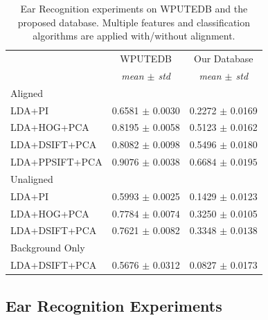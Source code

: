\begin{table}
\centering
\begin{tabular}{|l|c|c|}
\hline
& WPUTEDB & Our Database\\
& \emph{mean $\pm$ std} & \emph{mean $\pm$ std} \\
\hline\hline
\multicolumn{3}{|l|}{Aligned}\\
\hline

LDA+PI              &  0.6581 $\pm$ 0.0030 &       0.2272 $\pm$ 0.0169 \\
LDA+HOG+PCA         &  0.8195 $\pm$ 0.0058 &       0.5123 $\pm$ 0.0162 \\
LDA+DSIFT+PCA       &  0.8082 $\pm$ 0.0098 &       0.5496 $\pm$ 0.0180\\
LDA+PPSIFT+PCA      &  $\bm{0.9076}$ $\pm$ $\bm{0.0038}$ &       $\bm{0.6684}$ $\pm$ $\bm{0.0195}$\\

\hline\hline
\multicolumn{3}{|l|}{Unaligned}\\
\hline

LDA+PI              &  0.5993 $\pm$ 0.0025 &       0.1429 $\pm$ 0.0123\\
LDA+HOG+PCA         &  $\bm{0.7784}$ $\pm$ $\bm{0.0074}$ &       0.3250 $\pm$ 0.0105\\
LDA+DSIFT+PCA       &  0.7621 $\pm$ 0.0082 &       $\bm{0.3348}$ $\pm$ $\bm{0.0138}$\\

\hline\hline
\multicolumn{3}{|l|}{Background Only}\\
\hline

LDA+DSIFT+PCA       &  0.5676 $\pm$ 0.0312 &       0.0827 $\pm$ 0.0173 \\
\hline
\end{tabular}
\caption{Ear Recognition experiments on WPUTEDB and the proposed database. Multiple features and classification algorithms are applied with/without alignment.}
\label{tab:ear_recognition}
\end{table}



\subsection{Ear Recognition Experiments}



